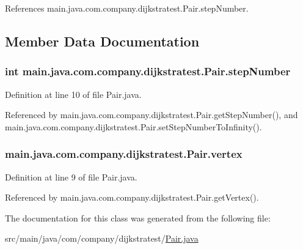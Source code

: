 References main.\-java.\-com.\-company.\-dijkstratest.\-Pair.\-step\-Number.



\subsection{Member Data Documentation}
\hypertarget{classmain_1_1java_1_1com_1_1company_1_1dijkstratest_1_1_pair_a4bc5c040004202d37e76798124cb1624}{
\subsubsection[{step\-Number}]{\setlength{\rightskip}{0pt plus 5cm}int main.\-java.\-com.\-company.\-dijkstratest.\-Pair.\-step\-Number\hspace{0.3cm}{\ttfamily [private]}}}\label{classmain_1_1java_1_1com_1_1company_1_1dijkstratest_1_1_pair_a4bc5c040004202d37e76798124cb1624}


Definition at line 10 of file Pair.\-java.



Referenced by main.\-java.\-com.\-company.\-dijkstratest.\-Pair.\-get\-Step\-Number(), and main.\-java.\-com.\-company.\-dijkstratest.\-Pair.\-set\-Step\-Number\-To\-Infinity().

\hypertarget{classmain_1_1java_1_1com_1_1company_1_1dijkstratest_1_1_pair_a1060ef3a7196fae57fde28c911ad02a0}{
\subsubsection[{vertex}]{ main.\-java.\-com.\-company.\-dijkstratest.\-Pair.\-vertex\hspace{0.3cm}{\ttfamily [private]}}}\label{classmain_1_1java_1_1com_1_1company_1_1dijkstratest_1_1_pair_a1060ef3a7196fae57fde28c911ad02a0}


Definition at line 9 of file Pair.\-java.



Referenced by main.\-java.\-com.\-company.\-dijkstratest.\-Pair.\-get\-Vertex().



The documentation for this class was generated from the following file\-:\begin{DoxyCompactItemize}
\item 
src/main/java/com/company/dijkstratest/\hyperlink{_pair_8java}{Pair.\-java}\end{DoxyCompactItemize}
